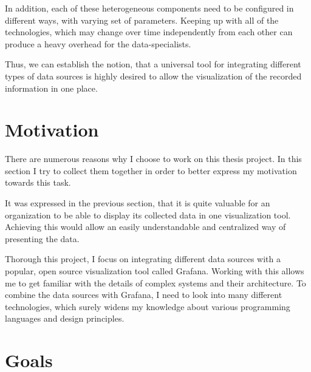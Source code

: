 In addition, each of these heterogeneous components need to be configured in different ways, with varying set of parameters. Keeping up with all of the technologies, which may change over time independently from each other  can produce a heavy overhead for the data-specialists.

Thus, we can establish the notion, that a universal tool for integrating different types of data sources is highly desired to allow the visualization of the recorded information in one place.

\section{Motivation}


There are numerous reasons why I choose to work on this thesis project. In this section I try to collect them together in order to better express my motivation towards this task.

It was expressed in the previous section, that it is quite valuable for an organization to be able to display its collected data in one visualization tool. Achieving this would allow an easily understandable and centralized way of presenting the data.

Thorough this project, I focus on integrating different data sources with a popular, open source visualization tool called Grafana. Working with this allows me to get familiar with the details of complex systems and their architecture. To combine the data sources with Grafana, I need to look into many different technologies, which surely widens my knowledge about various programming languages and design principles.

\section{Goals}

